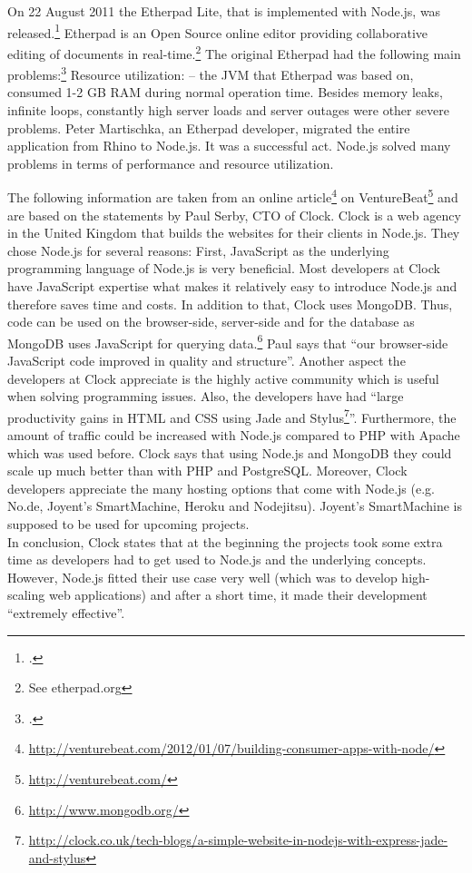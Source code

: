 \begin{appendices}
\begin{subappendices}
\label{app:etherpad}
On 22 August 2011 the Etherpad Lite, that is implemented with Node.js, was released.\footcite[Cf.][]{Martischka_2011}  Etherpad is an Open Source online editor providing collaborative editing of documents in real-time.\footnote{See etherpad.org} The original Etherpad had the following main problems:\footcite[Cf.][]{Martischka_2011} Resource utilization: – the JVM that Etherpad was based on, consumed 1-2 GB RAM during normal operation time. Besides memory leaks, infinite loops, constantly high server loads and server outages were other severe problems.
Peter Martischka, an Etherpad developer, migrated the entire application from Rhino to Node.js. It was a successful act. Node.js solved many problems in terms of performance and resource utilization. 

\label{app:case_clock}

The following information are taken from an online article\footnote{\url{http://venturebeat.com/2012/01/07/building-consumer-apps-with-node/}} on VentureBeat\footnote{\url{http://venturebeat.com/}} and are based on the statements by Paul Serby, CTO of Clock.
Clock is a web agency in the United Kingdom that builds the websites for their clients in Node.js. They chose Node.js for several reasons:
First, JavaScript as the underlying programming language of Node.js is very beneficial. Most developers at Clock have JavaScript expertise what makes it relatively easy to introduce Node.js and therefore saves time and costs. In addition to that, Clock uses MongoDB. Thus, code can be used on the browser-side, server-side and for the database as MongoDB uses JavaScript for querying data.\footnote{\url{http://www.mongodb.org/}}
Paul says that “our browser-side JavaScript code improved in quality and structure”. Another aspect the developers at Clock appreciate is the highly active community which is useful when solving programming issues. Also, the developers have had “large productivity gains in HTML and CSS using Jade and Stylus\footnote{\url{http://clock.co.uk/tech-blogs/a-simple-website-in-nodejs-with-express-jade-and-stylus}}”.
Furthermore, the amount of traffic could be increased with Node.js compared to PHP with Apache which was used before. Clock says that using Node.js and MongoDB they could scale up much better than with PHP and PostgreSQL. Moreover, Clock developers appreciate the many hosting options that come with Node.js (e.g. No.de, Joyent’s SmartMachine, Heroku and Nodejitsu). Joyent’s SmartMachine is supposed to be used for upcoming projects.\\
In conclusion, Clock states that at the beginning the projects took some extra time as developers had to get used to Node.js and the underlying concepts. However, Node.js fitted their use case very well (which was to develop high-scaling web applications) and after a short time, it made their development “extremely effective”.




\end{subappendices}
\end{appendices}
